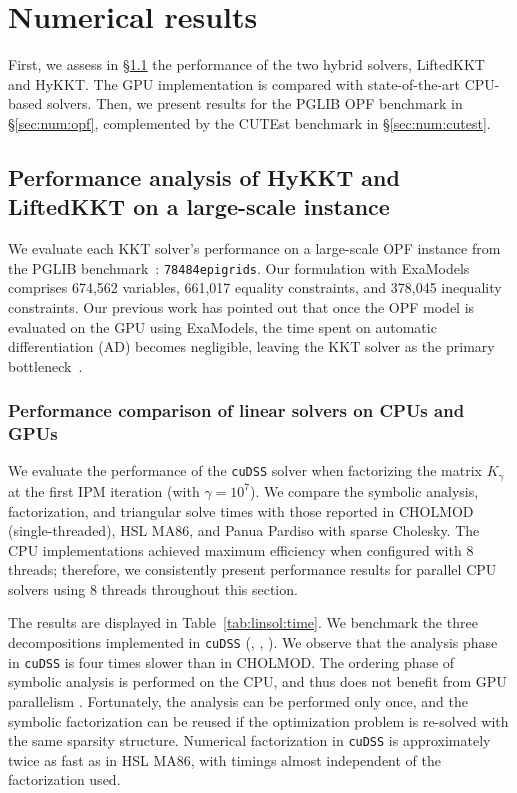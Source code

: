 \section{Numerical results}
First, we assess in \S\ref{sec:num:pprof} the performance of the two hybrid solvers, LiftedKKT and HyKKT.
The GPU implementation is compared with state-of-the-art CPU-based solvers.
Then, we present results for the PGLIB OPF benchmark in \S\ref{sec:num:opf},
 complemented by the CUTEst benchmark in \S\ref{sec:num:cutest}.


\subsection{Performance analysis of HyKKT and LiftedKKT on a large-scale instance}
\label{sec:num:pprof}
We evaluate each KKT solver's performance on a large-scale OPF instance from
the PGLIB benchmark~\cite{babaeinejadsarookolaee2019power}: {\tt 78484epigrids}.
Our formulation with ExaModels comprises 674,562 variables, 661,017 equality constraints, and 378,045 inequality constraints.
Our previous work has pointed out that once the OPF model is evaluated
on the GPU using ExaModels, the time spent on automatic differentiation (AD) becomes negligible, leaving
the KKT solver as the primary bottleneck~\cite{shin2023accelerating}.


\subsubsection{Performance comparison of linear solvers on CPUs and GPUs}
We evaluate the performance of the {\tt cuDSS} solver when
factorizing the matrix $K_{\gamma}$ at the first IPM iteration (with
$\gamma = 10^7$). We compare the symbolic analysis,
factorization, and triangular solve times with those reported in CHOLMOD
(single-threaded), HSL MA86, and Panua Pardiso with sparse Cholesky.
The CPU implementations achieved maximum efficiency when configured with 8 threads;
therefore, we consistently present performance results
for parallel CPU solvers using 8 threads throughout this section.

The results are displayed in Table~\ref{tab:linsol:time}.
We benchmark the three decompositions implemented in {\tt cuDSS} (\llt, \ldlt, \lu).
We observe that the analysis phase in {\tt cuDSS} is four times slower than in CHOLMOD.
The ordering phase of symbolic analysis is performed on the CPU, and thus does not benefit from GPU parallelism \cite{nvidiaNVIDIACuDSSPreview}. Fortunately, the analysis can be performed only once, and the symbolic factorization can be reused if the optimization problem is re-solved with the same sparsity structure.
Numerical factorization in {\tt cuDSS} is approximately twice as fast as in HSL MA86, with timings almost independent of the factorization used.


